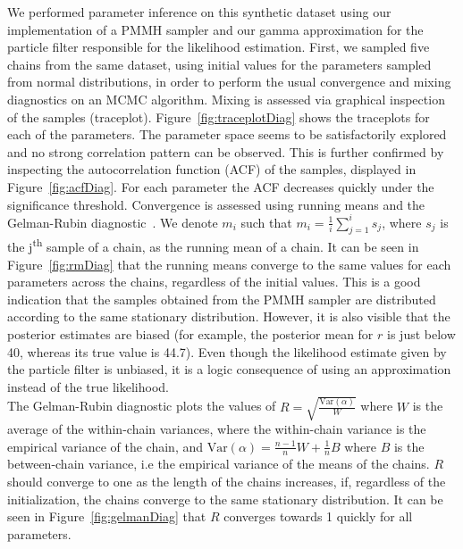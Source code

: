 \documentclass[12pt]{article}
\begin{document}
\clearpage
	We performed parameter inference on this synthetic dataset using our implementation of a PMMH sampler and our gamma approximation for the particle filter responsible for the likelihood estimation. First, we sampled five chains from the same dataset, using initial values for the parameters sampled from normal distributions,  in order to perform the usual convergence and mixing diagnostics on an MCMC algorithm. Mixing is assessed via graphical inspection of the samples (traceplot). Figure~\ref{fig:traceplotDiag} shows the traceplots for each of the parameters. The parameter space seems to be satisfactorily explored and no strong correlation pattern can be observed. This is further confirmed by inspecting the autocorrelation function (ACF) of the samples, displayed in Figure~\ref{fig:acfDiag}. For each parameter the ACF decreases quickly under the significance threshold. Convergence is assessed using running means and the Gelman-Rubin diagnostic~\cite{gelman1992inference}. We denote $m_i$ such that $m_i=\frac{1}{i}\sum_{j=1}^{i}s_j$, where $s_j$ is the j\textsuperscript{th} sample of a chain, as the running mean of a chain. It can be seen in Figure~\ref{fig:rmDiag} that the running means converge to the same values for each parameters across the chains, regardless of the initial values. This is a good indication that the samples obtained from the PMMH sampler are distributed according to the same stationary distribution. However, it is also visible that the posterior estimates are biased (for example, the posterior mean for $r$ is just below 40, whereas its true value is 44.7). Even though the likelihood estimate given by the particle filter is unbiased, it is a logic consequence of using an approximation instead of the true likelihood. \\
	The Gelman-Rubin diagnostic plots the values of $R = \sqrt{\frac{\mathrm{Var}(\alpha)}{W}}$ where $W$ is the average of the within-chain variances, where the within-chain variance is the empirical variance of the chain, and $ \mathrm{Var}(\alpha) = \frac{n-1}{n}W + \frac{1}{n}B$ where $B$ is the between-chain variance, i.e the empirical variance of the means of the chains. $R$ should converge to one as the length of the chains increases, if, regardless of the initialization, the chains converge to the same stationary distribution. It can be seen in Figure~\ref{fig:gelmanDiag} that $R$ converges towards 1 quickly for all parameters. 
	
\end{document}
